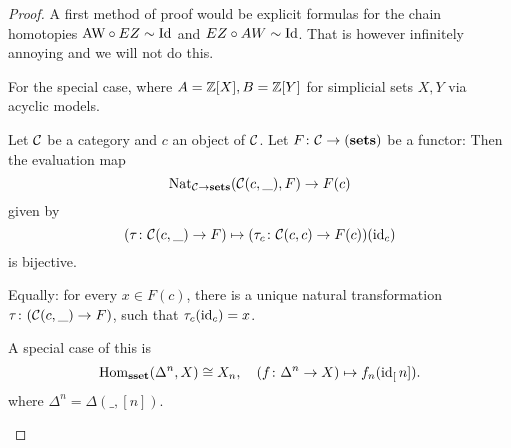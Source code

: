 \documentclass[language=english]{TemplateLecture}
\begin{document}
\begin{proof}
    A first method of proof would be explicit formulas for the chain homotopies \(\text{AW} \circ EZ \sim \operatorname{Id}\) and \(EZ \circ AW \sim \operatorname{Id}\). That is however infinitely annoying and we will not do this.

    For the special case, where \(A = \mathbb{Z}[X], B= \mathbb{Z}[Y]\) for simplicial sets \(X,Y\) via acyclic models.

    \begin{proposition}
        Let \(\mathcal{C}\) be a category and \(c\) an object of \(\mathcal{C}\). Let \(F\colon \mathcal{C} \to (\mathbf{sets})\) be a functor: Then the evaluation map
        \[\mathrm{Nat}_{\mathcal{C} \to \mathbf{sets}}(\mathcal{C}(c,\_), F) \to F(c)\]
        given by
        \[(\tau\colon \mathcal{C}(c,\_) \to F) \mapsto (\tau_c\colon \mathcal{C}(c,c)\to F(c))(\operatorname{id}_c)\]
        is bijective.

        Equally: for every \(x \in F(c)\), there is a unique natural transformation \(\tau\colon (\mathcal{C}(c, \_) \to F)\), such that \(\tau_c(\operatorname{id}_c) = x\).
    \end{proposition}

    \begin{Remark}
        A special case of this is
        \[\operatorname{Hom}_{\mathbf{sset}}(\Delta^n, X) \cong X_n, \quad (f\colon \Delta
        ^n\to X) \mapsto f_n(\operatorname{id}_[n]).\]
        where \(\Delta^n = \Delta(\_, [n])\).
    \end{Remark}


\end{proof}
\end{document}
